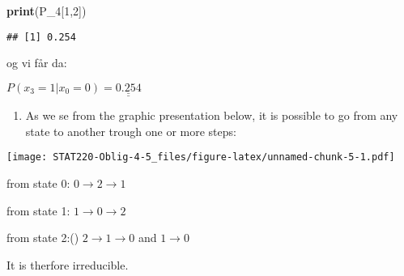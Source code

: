 \documentclass[]{article}
\newenvironment{Shaded}{\begin{snugshade}}{\end{snugshade}}
\newcommand{\DataTypeTok}[1]{\textcolor[rgb]{0.13,0.29,0.53}{#1}}
\newcommand{\DecValTok}[1]{\textcolor[rgb]{0.00,0.00,0.81}{#1}}
\newcommand{\FloatTok}[1]{\textcolor[rgb]{0.00,0.00,0.81}{#1}}
\newcommand{\KeywordTok}[1]{\textcolor[rgb]{0.13,0.29,0.53}{\textbf{#1}}}
\newcommand{\NormalTok}[1]{#1}
\newcommand{\OperatorTok}[1]{\textcolor[rgb]{0.81,0.36,0.00}{\textbf{#1}}}
\newcommand{\OtherTok}[1]{\textcolor[rgb]{0.56,0.35,0.01}{#1}}
\newcommand{\StringTok}[1]{\textcolor[rgb]{0.31,0.60,0.02}{#1}}
\providecommand{\tightlist}{%
  \setlength{\itemsep}{0pt}\setlength{\parskip}{0pt}}
\begin{document}
\begin{Shaded}
\begin{Highlighting}[]
\KeywordTok{print}\NormalTok{(P_}\DecValTok{4}\NormalTok{[}\DecValTok{1}\NormalTok{,}\DecValTok{2}\NormalTok{])}
\end{Highlighting}
\end{Shaded}

\begin{verbatim}
## [1] 0.254
\end{verbatim}

og vi får da:

\(P(x_{3}=1|x_{0}=0) = \underline{\underline{0.254}}\)

\begin{enumerate}
\def\labelenumi{\alph{enumi})}
\setcounter{enumi}{1}
\tightlist
\item
  As we se from the graphic presentation below, it is possible to go
  from any state to another trough one or more steps:
\end{enumerate}

\begin{Shaded}
\end{Shaded}

\texttt{[image: STAT220-Oblig-4-5\_files/figure-latex/unnamed-chunk-5-1.pdf]}

from state 0: \(0\rightarrow 2\rightarrow 1\)

from state 1: \(1\rightarrow 0\rightarrow 2\)

from state 2:() \(2\rightarrow 1\rightarrow 0\) and \(1\rightarrow 0\)

It is therfore irreducible.
\end{document}
